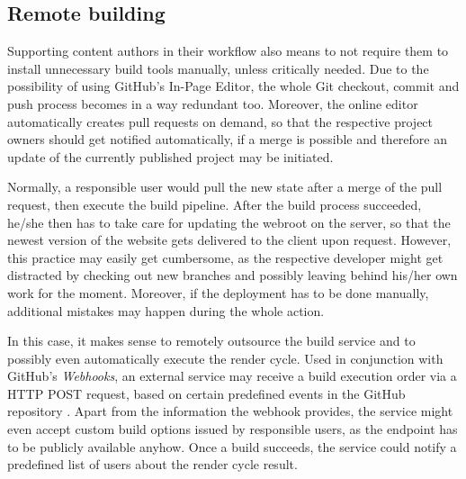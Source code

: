 \subsection{Remote building}
\label{sec:solutions-remotebuilding}

Supporting content authors in their workflow also means to not require them to install unnecessary build tools manually, unless critically needed. Due to the possibility of using GitHub's In-Page Editor, the whole Git checkout, commit and push process becomes in a way redundant too. Moreover, the online editor automatically creates pull requests on demand, so that the respective project owners should get notified automatically, if a merge is possible and therefore an update of the currently published project may be initiated.

Normally, a responsible user would pull the new state after a merge of the pull request, then execute the build pipeline. After the build process succeeded, he/she then has to take care for updating the webroot on the server, so that the newest version of the website gets delivered to the client upon request. However, this practice may easily get cumbersome, as the respective developer might get distracted by checking out new branches and possibly leaving behind his/her own work for the moment. Moreover, if the deployment has to be done manually, additional mistakes may happen during the whole action.

In this case, it makes sense to remotely outsource the build service and to possibly even automatically execute the render cycle. Used in conjunction with GitHub's \emph{Webhooks}, an external service may receive a build execution order via a HTTP POST request, based on certain predefined events in the GitHub repository \cite{GithubWebhooks}. Apart from the information the webhook provides, the service might even accept custom build options issued by responsible users, as the endpoint has to be publicly available anyhow. Once a build succeeds, the service could notify a predefined list of users about the render cycle result.

